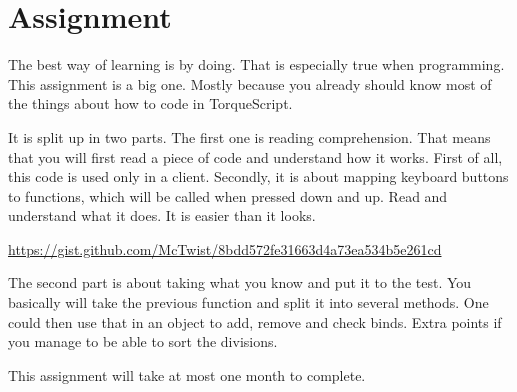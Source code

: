\section{Assignment}

The best way of learning is by doing. That is especially true when programming. This assignment is a big one. Mostly because you already should know most of the things about how to code in TorqueScript.

It is split up in two parts. The first one is reading comprehension. That means that you will first read a piece of code and understand how it works. First of all, this code is used only in a client. Secondly, it is about mapping keyboard buttons to functions, which will be called when pressed down and up. Read and understand what it does. It is easier than it looks.

\url{https://gist.github.com/McTwist/8bdd572fe31663d4a73ea534b5e261cd}

The second part is about taking what you know and put it to the test. You basically will take the previous function and split it into several methods. One could then use that in an object to add, remove and check binds. Extra points if you manage to be able to sort the divisions.

This assignment will take at most one month to complete.
